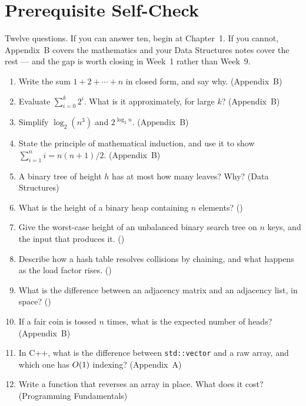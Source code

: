 \newpage

\chapter*{Prerequisite Self-Check}

Twelve questions. If you can answer ten, begin at Chapter~1. If you cannot,
Appendix~B covers the mathematics and your Data Structures notes cover the
rest --- and the gap is worth closing in Week~1 rather than Week~9.

\begin{enumerate}[leftmargin=2.4em, itemsep=4pt, topsep=4pt]
  \item Write the sum $1 + 2 + \cdots + n$ in closed form, and say why.
        \hfill{\scriptsize\color{neutral}(Appendix~B)}
  \item Evaluate $\sum_{i=0}^{k} 2^{i}$. What is it approximately, for large
        $k$? \hfill{\scriptsize\color{neutral}(Appendix~B)}
  \item Simplify $\log_2(n^3)$ and $2^{\log_2 n}$.
        \hfill{\scriptsize\color{neutral}(Appendix~B)}
  \item State the principle of mathematical induction, and use it to show
        $\sum_{i=1}^{n} i = n(n+1)/2$.
        \hfill{\scriptsize\color{neutral}(Appendix~B)}
  \item A binary tree of height $h$ has at most how many leaves? Why?
        \hfill{\scriptsize\color{neutral}(Data Structures)}
  \item What is the height of a binary heap containing $n$ elements?
        \hfill{\scriptsize\color{neutral}()}
  \item Give the worst-case height of an unbalanced binary search tree on $n$
        keys, and the input that produces it.
        \hfill{\scriptsize\color{neutral}()}
  \item Describe how a hash table resolves collisions by chaining, and what
        happens as the load factor rises.
        \hfill{\scriptsize\color{neutral}()}
  \item What is the difference between an adjacency matrix and an adjacency
        list, in space? \hfill{\scriptsize\color{neutral}()}
  \item If a fair coin is tossed $n$ times, what is the expected number of
        heads? \hfill{\scriptsize\color{neutral}(Appendix~B)}
  \item In C++, what is the difference between \texttt{std::vector} and a raw
        array, and which one has $O(1)$ indexing?
        \hfill{\scriptsize\color{neutral}(Appendix~A)}
  \item Write a function that reverses an array in place. What does it cost?
        \hfill{\scriptsize\color{neutral}(Programming Fundamentals)}
\end{enumerate}

